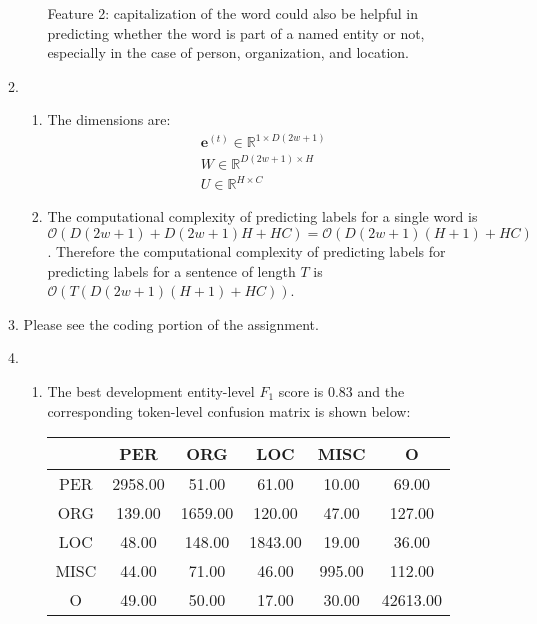 \documentclass[10pt,reqno]{amsart}
\begin{document}
\begin{enumerate}[topsep=0pt,itemsep=3ex,partopsep=1ex,parsep=1ex]
\begin{enumerate}[itemsep=2ex]
\begin{enumerate}[itemsep=2ex]
        Feature 2: capitalization of the word could also be helpful in predicting 
        whether the word is part of a named entity or not, especially in the case of
        person, organization, and location. 
    \end{enumerate}
  \item 
    \begin{enumerate}[itemsep=2ex]
      \item The dimensions are:
        \begin{align*}
          \bm{e}^{(t)} \in \mathbb{R}^{1 \times D(2w+1)} \\
          W \in \mathbb{R}^{D(2w+1) \times H} \\
          U \in \mathbb{R}^{H \times C} 
        \end{align*}
      \item The computational complexity of predicting labels for a single word is
        $\mathcal{O}(D(2w+1) + D(2w+1)H + HC) = \mathcal{O}(D(2w+1)(H+1) + HC)$.
        Therefore the computational complexity of predicting labels for predicting labels for
        a sentence of length $T$ is
        $\mathcal{O}(T (D(2w+1)(H+1) + HC))$.
    \end{enumerate}
  \item Please see the coding portion of the assignment.
  \item 
    \begin{enumerate}[itemsep=2ex]
      \item The best development entity-level $F_1$ score is 0.83 and 
        the corresponding token-level confusion matrix is shown below:
        \vspace{1mm}
        \begin{center}
          \begin{tabular}{c|c|c|c|c|c}
             & PER  &   ORG  &   LOC  &   MISC  &  O       \\
            \hline
            PER  &    2958.00 & 51.00   & 61.00   & 10.00  &  69.00   \\
            \hline
            ORG  &    139.00  & 1659.00 & 120.00  & 47.00  &  127.00  \\
            \hline
            LOC  &    48.00   & 148.00  & 1843.00 & 19.00  &  36.00   \\
            \hline
            MISC &    44.00   & 71.00   & 46.00   & 995.00 &  112.00  \\
            \hline
            O    &    49.00   & 50.00   & 17.00   & 30.00  &  42613.00

\end{tabular}
\end{center}
\end{enumerate}
\end{enumerate}
\end{enumerate}
\end{document}

